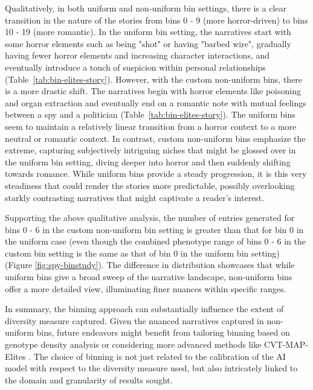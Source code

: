 Qualitatively, in both uniform and non-uniform bin settings, there is a clear transition in the nature of the stories from bins 0 - 9 (more horror-driven) to bins 10 - 19 (more romantic). In the uniform bin setting, the narratives start with some horror elements such as being "shot" or having "barbed wire", gradually having fewer horror elements and increasing character interactions, and eventually introduce a touch of suspicion within personal relationships (Table~\ref{tab:bin-elites-story}). However, with the custom non-uniform bins, there is a more drastic shift. The narratives begin with horror elements like poisoning and organ extraction and eventually end on a romantic note with mutual feelings between a spy and a politician (Table~\ref{tab:bin-elites-story}). The uniform bins seem to maintain a relatively linear transition from a horror context to a more neutral or romantic context. In contrast, custom non-uniform bins emphasize the extreme, capturing subjectively intriguing niches that might be glossed over in the uniform bin setting, diving deeper into horror and then suddenly shifting towards romance. While uniform bins provide a steady progression, it is this very steadiness that could render the stories more predictable, possibly overlooking starkly contrasting narratives that might captivate a reader's interest.

Supporting the above qualitative analysis, the number of entries generated for bins 0 - 6 in the custom non-uniform bin setting is greater than that for bin 0 in the uniform case (even though the combined phenotype range of bins 0 - 6 in the custom bin setting is the same as that of bin 0 in the uniform bin setting) (Figure \ref{fig:spy-binstudy}). The difference in distribution showcases that while uniform bins give a broad sweep of the narrative landscape, non-uniform bins offer a more detailed view, illuminating finer nuances within specific ranges.

In summary, the binning approach can substantially influence the extent of diversity measure captured. Given the nuanced narratives captured in non-uniform bins, future endeavors might benefit from tailoring binning based on genotype density analysis or considering more advanced methods like CVT-MAP-Elites \citep{vassiliades2016scaling}. The choice of binning is not just related to the calibration of the AI model with respect to the diversity measure used, but also intricately linked to the domain and granularity of results sought.


\clearpage
\newpage

